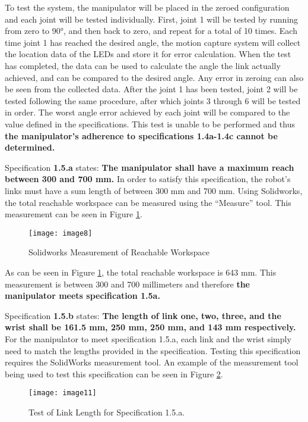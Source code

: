 To test the system, the manipulator will be placed in the zeroed configuration and each joint will be tested individually. First, joint 1 will be tested by running from zero to 90°, and then back to zero, and repeat for a total of 10 times. Each time joint 1 has reached the desired angle, the motion capture system will collect the location data of the LEDs and store it for error calculation. When the test has completed, the data can be used to calculate the angle the link actually achieved, and can be compared to the desired angle. Any error in zeroing can also be seen from the collected data. After the joint 1 has been tested, joint 2 will be tested following the same procedure, after which joints 3 through 6 will be tested in order. The worst angle error achieved by each joint will be compared to the value defined in the specifications. This test is unable to be performed and thus \textbf{the manipulator’s adherence to specifications 1.4a-1.4c cannot be determined.}


Specification \textbf{1.5.a} states: \textbf{The manipulator shall have a maximum reach between 300 and 700 mm.} In order to satisfy this specification, the robot’s links must have a sum length of between 300 mm and 700 mm. Using Solidworks, the total reachable workspace can be measured using the “Measure” tool. This measurement can be seen in Figure \ref{fig:meas}.

\begin{figure}[htp]
  \centering
  \texttt{[image: image8]}
  \caption{Solidworks Measurement of Reachable Workspace}
  \label{fig:meas}
\end{figure}

As can be seen in Figure \ref{fig:meas}, the total reachable workspace is 643 mm. This measurement is between 300 and 700 millimeters and therefore \textbf{the manipulator meets specification 1.5a.}

Specification \textbf{1.5.b} states: \textbf{The length of link one, two, three, and the wrist shall be 161.5 mm, 250 mm, 250 mm, and 143 mm respectively.} For the manipulator to meet specification 1.5.a, each link and the wrist simply need to match the lengths provided in the specification. Testing this specification requires the SolidWorks measurement tool. An example of the measurement tool being used to test this specification can be seen in Figure \ref{fig:llength}.

\begin{figure}[htp]
  \centering
  \texttt{[image: image11]}
  \caption{Test of Link Length for Specification 1.5.a.}
  \label{fig:llength}
\end{figure}

